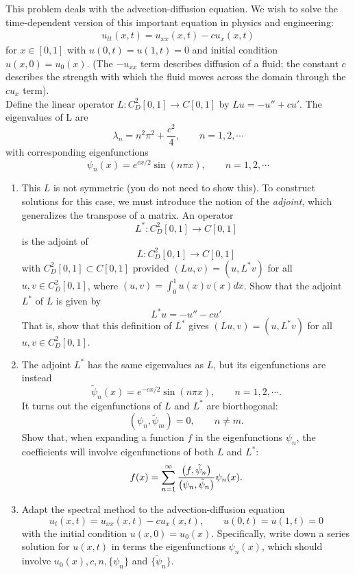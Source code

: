 
This problem deals with the advection-diffusion equation. We wish to solve the time-dependent version of this important equation in physics and engineering:
 \begin{align*}
u_{tt}(x, t) = u_{xx}(x, t) - cu_x(x, t)  
 \end{align*}
for $x \in [0, 1]$ with $u(0, t) = u(1, t) = 0$ and initial condition $u(x, 0) = u_0(x).$ (The $-u_{xx}$ term describes
diffusion of a fluid; the constant $c$ describes the strength with which the fluid moves across the domain through the $cu_x$ term).\\
 
Define the linear operator $L : C_D^2 [0, 1] \rightarrow C[0, 1]$ by $Lu = -u'' + cu'.$ The eigenvalues of L are
\[
\lambda_n = n^2\pi^2+ \frac{c^2}{4}, \qquad n=1,2, \cdots
\] 
with corresponding eigenfunctions
\[
\psi_n(x) = e^{cx/2} \sin(n\pi x),\qquad  n = 1, 2, \cdots
\]

\begin{enumerate}

\item This $L$  is not symmetric (you do not need to show this). To construct solutions for this case, we must introduce the notion of the \textit{adjoint}, which generalizes the transpose of a matrix. An operator 
\[
L^*: C_D^2 [0, 1] \rightarrow C[0, 1]
\]
is the adjoint of 
 \[
 L: C_D^2 [0, 1] \rightarrow C[0, 1]
 \]
with  $C_D^2 [0, 1] \subset C[0, 1]$ provided $(Lu, v) = (u, L^*v)$ for all $u, v \in  C_D^2 [0, 1] $, where $(u,v) = \int_0^1 u(x)v(x)dx$. 
Show that the adjoint $L^*$ of $L$ is given by
\[
L^*u = -u'' - cu'
\]
That is, show that this definition of $L^*$ gives $(Lu, v) = (u, L^*v)$ for all  $u, v \in  C_D^2 [0, 1] .$

\item The adjoint $L^*$ has the same eigenvalues as $L$, but its eigenfunctions are instead
\[
\tilde{\psi}_n(x) = e^{-cx/2} \sin(n\pi x), \qquad n = 1, 2, \cdots.
\]
It turns out the eigenfunctions of $L$ and $L^*$ are biorthogonal:
\[
(\psi_n, \tilde{\psi}_m) = 0, \qquad  n \neq m.
\]
Show that, when expanding a function $f$ in the eigenfunctions ${\psi_n}$, the coefficients will involve
eigenfunctions of both $L$ and $L^* :$
\[
f(x) = \sum_{n=1}^{\infty} \frac{\left( f, \tilde{\psi}_n \right)}{\left( \psi_n, \tilde{\psi}_n \right)}  \psi_n(x).
\] 
\item Adapt the spectral method to the advection-diffusion equation
\[
u_t(x, t) = u_{xx}(x, t) - c u_x(x, t), \qquad u(0, t) = u(1, t) = 0
\]
with the initial condition $u(x, 0) = u_0(x).$  Specifically, write down a series solution for $u(x,t)$ in terms the eigenfunctions $\psi_n(x)$, which should involve $u_0(x), c, n, \{\psi_{n}\}$ and $\{\tilde{\psi}_{n}\}$.
 \end{enumerate}


